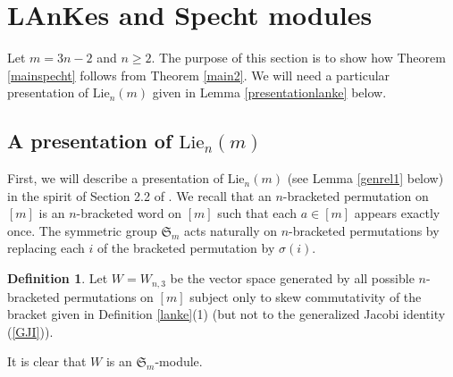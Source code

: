 \documentclass[11pt]{amsart}
\theoremstyle{definition}
\newtheorem{defn}[thm]{Definition}
\numberwithin{equation}{section}
\begin{document}
\section{LAnKes and Specht modules}
Let $m=3n-2$ and $n \ge 2$.  The purpose of this section is to show how Theorem \ref{mainspecht} follows from Theorem \ref{main2}. We will need a particular presentation of $\text{Lie}_n(m)$ given in Lemma \ref{presentationlanke} below.
\subsection{A presentation of $\text{Lie}_n(m)$} 

First, we will describe a presentation of $\text{Lie}_n(m)$ (see Lemma \ref{genrel1} below) in the spirit of Section 2.2 of \cite{FHSW}. We recall that an $n$-bracketed permutation on $[m]$ is an $n$-bracketed word on $[m]$ such that each $a \in [m]$ appears exactly once. The symmetric group $\mathfrak{S}_m$ acts naturally on $n$-bracketed permutations by replacing each $i$ of the bracketed permutation by $\sigma(i)$.

\begin{defn} Let $W=W_{n,3}$ be the vector space generated by all possible $n$-bracketed permutations on $[m]$ subject only to skew commutativity of the bracket given in Definition  \ref{lanke}(1) (but not to the generalized Jacobi identity  (\ref{GJI})).
\end{defn}
It is clear that $W$ is an $\mathfrak{S}_m$-module.
\end{document}
